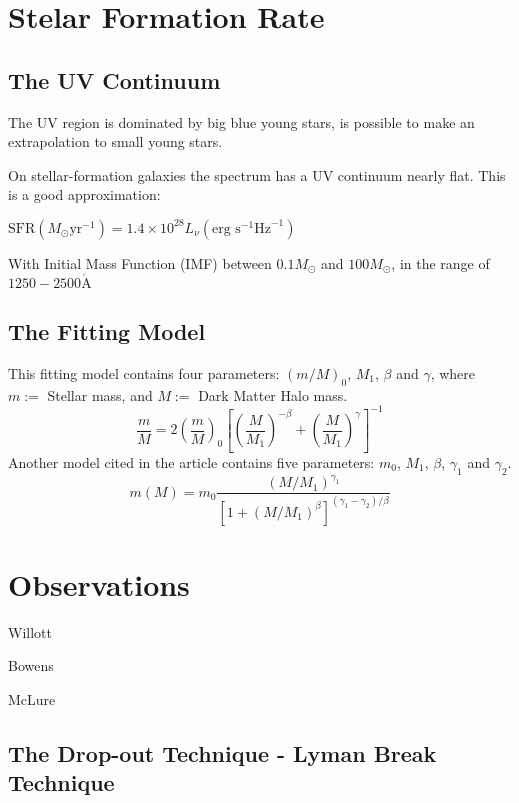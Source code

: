 \documentclass[manuscript]{aastex}
\begin{document}
\section{Stelar Formation Rate}

\subsection{The UV Continuum}
The UV region is dominated by big blue young stars, is possible to make an extrapolation to small young stars.

On stellar-formation galaxies the spectrum has a UV continuum nearly flat. This is a good approximation:

$ \textrm{SFR}\left(M_\odot \textrm{yr}^{-1}\right) = 1.4 \times 10^{28} L_{\nu} \left( \textrm{erg s}^{-1}\textrm{Hz}^{-1} \right)$

With Initial Mass Function (IMF) between $0.1 M_\odot$ and $100 M_\odot$, in the range of $1250-2500 \mathring{\textrm{A}} $


\subsection{The Fitting Model}

This fitting model contains four parameters: $\left(m/M\right)_0$, $M_1$, $\beta$ and $\gamma$, 
where $m:=$ Stellar mass, and $M :=$ Dark Matter Halo mass.
\begin{equation}
\frac{m}{M} = 2 \left( \frac{m}{M} \right)_{0} 
		  \left[ \left(\frac{M}{M_1}\right)^{-\beta} + \left(\frac{M}{M_1}\right)^{\gamma} \right]^{-1} 
\end{equation}
Another model cited in the article contains five parameters: $m_0$, $M_1$, $\beta$, $\gamma_1$ and $\gamma_2$.
\[ m(M) = m_0 \frac{ (M/M_1)^{\gamma_1}}{ \left[ 1 + (M/M_1)^\beta \right]^{ (\gamma_1-\gamma_2)/\beta}} \]


\section{Observations}

Willott

Bowens

McLure

\subsection{The Drop-out Technique - Lyman Break Technique}
\end{document}
